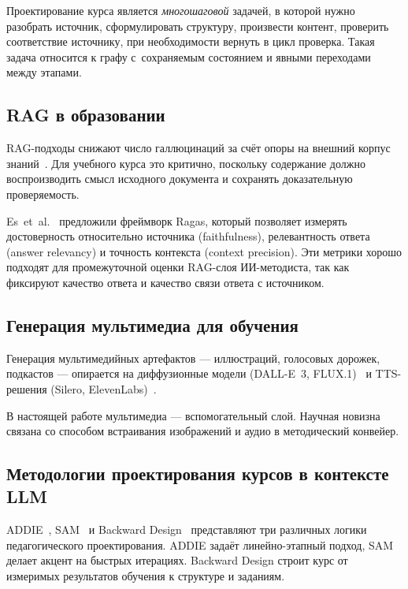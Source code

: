 Проектирование курса является \textit{многошаговой} задачей, в которой
нужно разобрать источник, сформулировать структуру, произвести контент,
проверить соответствие источнику,
при необходимости вернуть в цикл проверка. Такая задача относится к графу
с~сохраняемым состоянием и явными переходами между этапами.

\subsection{RAG в образовании}

RAG-подходы снижают число галлюцинаций за счёт опоры на внешний
корпус знаний~\cite{lewis_rag_2020}. Для учебного курса это критично,
поскольку содержание должно воспроизводить смысл исходного документа
и сохранять доказательную проверяемость.

Es~et~al.~\cite{es_ragas_2023} предложили фреймворк Ragas, который
позволяет измерять достоверность относительно источника
(faithfulness), релевантность ответа (answer relevancy)
и точность контекста (context precision).
Эти метрики хорошо подходят для промежуточной оценки RAG-слоя
ИИ-методиста, так как фиксируют качество ответа и качество связи ответа
с источником.

\subsection{Генерация мультимедиа для обучения}

Генерация мультимедийных артефактов —
иллюстраций, голосовых дорожек, подкастов — опирается на диффузионные модели
(DALL-E~3, FLUX.1)~\cite{dalle3_2023, flux_2024} и
TTS-решения (Silero, ElevenLabs)~\cite{silero_tts_2024, elevenlabs_2024}.

В настоящей работе мультимедиа — вспомогательный слой.
Научная новизна связана со способом встраивания изображений и аудио
в методический конвейер.

\subsection{Методологии проектирования курсов в контексте LLM}

ADDIE~\cite{addie_molenda_2003}, SAM~\cite{allen_sam_2012} и
Backward Design~\cite{wiggins_backward_design_2005} представляют
три различных логики педагогического проектирования.
ADDIE задаёт линейно-этапный подход, SAM делает акцент на быстрых
итерациях. Backward Design строит курс от измеримых результатов
обучения к структуре и заданиям.

